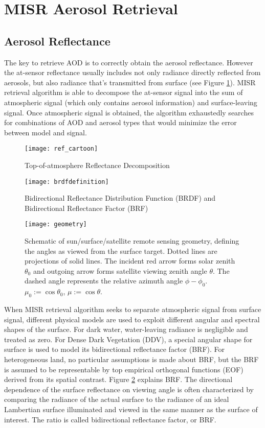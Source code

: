 \section{MISR Aerosol Retrieval}
\subsection{Aerosol Reflectance}
The key to retrieve AOD is to correctly obtain the aerosol reflectance. However the at-sensor reflectance usually includes not only radiance directly reflected from aerosols, but also radiance that's transmitted from surface (see Figure \ref{fig:ref_cartoon}). MISR retrieval algorithm is able to decompose the at-sensor signal into the sum of atmospheric signal (which only contains aerosol information) and surface-leaving signal. Once atmospheric signal is obtained, the algorithm exhaustedly searches for combinations of AOD and aerosol types that would minimize the error between model and signal.

\begin{figure}[h!]
    \centering
    \texttt{[image: ref\_cartoon]}
    \caption{Top-of-atmosphere Reflectance Decomposition}
    \label{fig:ref_cartoon}
\end{figure}

\begin{figure}[h!]
    \centering
    \texttt{[image: brdfdefinition]}
    \caption{Bidirectional Reflectance Distribution Function (BRDF) and Bidirectional Reflectance Factor (BRF)}
    \label{fig:brdf_definition}
\end{figure}


\begin{figure}[h!]
    \centering
    \texttt{[image: geometry]}
    \caption{Schematic of sun/surface/satellite remote sensing geometry, defining the angles as viewed from the surface target. Dotted lines are projections of solid lines. The incident red arrow forms solar zenith $\theta_0$ and outgoing arrow forms satellite viewing zenith angle $\theta$. The dashed angle represents the relative azimuth angle $\phi-\phi_0$. $\mu_0 :=\cos\theta_0$, $\mu :=\cos\theta$.}
    \label{fig:geometry}
\end{figure}

When MISR retrieval algorithm seeks to separate atmospheric signal from surface signal, different physical models are used to exploit different angular and spectral shapes of the surface. For dark water, water-leaving radiance is negligible and treated as zero. For Dense Dark Vegetation (DDV), a special angular shape for surface is used to model its bidirectional reflectance factor (BRF)\cite{rahman1993}. For heterogeneous land, no particular assumptions is made about BRF, but the BRF is assumed to be representable by top empirical orthogonal functions (EOF) derived from its spatial contrast. Figure \ref{fig:brdf_definition} explains BRF. The directional dependence of the surface reflectance on viewing angle is often characterized by comparing the radiance of the actual surface to the radiance of an ideal Lambertian surface illuminated and viewed in the same manner as the surface of interest. The ratio is called bidirectional reflectance factor, or BRF.

